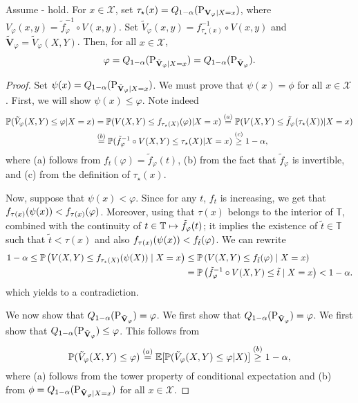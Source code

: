 
\begin{theorem}\label{thm:conditional:varphi}
  Assume - hold. For $x \in \mathcal{X}$, set $\tau_{\star}(x)= Q_{1-\alpha}(\textup{P}_{\mathbf{V}_\varphi|X=x})$, where $V_\varphi(x,y)= \tilde{f}^{-1}_\varphi \circ V(x,y)$. Set  $\tilde{V}_\varphi(x,y)= f_{\tau_\star(x)}^{-1} \circ V(x,y)$ and $\tilde{\mathbf{V}}_\varphi= \tilde{V}_\varphi(X,Y)$.
  Then,  for all $x \in \mathcal{X}$, 
  \[
    \varphi= Q_{1-\alpha}(\textup{P}_{\tilde{\mathbf{V}}_\varphi|X=x})= Q_{1-\alpha}(\textup{P}_{\tilde{\mathbf{V}}_\varphi}).
  \]
\end{theorem}

\begin{proof}
  Set $\psi(x)= Q_{1-\alpha}(\textup{P}_{\tilde{\mathbf{V}}_\varphi|X=x})$. We must prove that $\psi(x)= \phi$ for all $x \in \mathcal{X}$. First, we will show $\psi(x) \leq \varphi$. Note indeed
  \begin{align}
    \mathbb{P}( \tilde{V}_\varphi(X,Y) \leq \varphi | X=x) &= 
    \mathbb{P}( V(X,Y) \leq f_{\tau_\star(X)}(\varphi) | X=x) \stackrel{(a)}{=} \mathbb{P}(V(X,Y) \leq \tilde{f}_{\varphi}(\tau_\star(X))|X=x) \\ &\stackrel{(b)}{=} \mathbb{P}(\tilde{f}_\varphi^{-1} \circ V(X,Y) \leq \tau_\star(X) | X=x)  \stackrel{(c)}{\geq} 1-\alpha,
  \end{align}
  where (a) follows from $f_t(\varphi)= \tilde{f}_\varphi(t)$, (b) from the fact that $\tilde{f}_\varphi$ is invertible, and (c) from the definition of $\tau_\star(x)$.

  Now, suppose that  $\psi(x) <\varphi$. Since for any $t$, $f_t$ is increasing, we get that $f_{\tau(x)}(\psi(x))<f_{\tau(x)}(\varphi)$. Moreover, using that $\tau(x)$ belongs to the interior of $\mathbb{T}$, combined with the continuity of $t\in\mathbb{T}\mapsto\tilde{f}_{\varphi}(t)$; it implies the existence of $\tilde{t}\in\mathbb{T}$ such that $\tilde{t}<\tau(x)$ and also $f_{\tau(x)}(\psi(x)) < f_{\tilde{t}}(\varphi)$.
  We can rewrite
  \begin{align*}
    1-\alpha \leq \mathbb{P}\left({V(X,Y)\le f_{\tau_\star(X)}(\psi(X)) \mid X=x}\right)
    &\le \mathbb{P}\left({V(X,Y)\le f_{\tilde{t}}(\varphi) \mid X=x}\right)
    \\
    &= \mathbb{P}\left({\tilde{f}_{\varphi}^{-1} \circ V(X,Y)\le \tilde{t} \mid X=x}\right) < 1-\alpha.
  \end{align*}
  which yields to a contradiction.

  We now show that $Q_{1-\alpha}(\textup{P}_{\tilde{\mathbf{V}}_\varphi})= \varphi$. We first show that $Q_{1-\alpha}(\textup{P}_{\tilde{\mathbf{V}}_\varphi})= \varphi$. We first show that $Q_{1-\alpha}(\textup{P}_{\tilde{\mathbf{V}}_\varphi}) \leq \varphi$. This follows from 
  \[
    \mathbb{P}(\tilde{V}_\varphi(X,Y) \leq \varphi) \stackrel{(a)}{=}
    \mathbb{E}[ \mathbb{P}(\tilde{V}_\varphi(X,Y) \leq \varphi |X)] \stackrel{(b)}{\geq} 1 - \alpha,
  \]
  where (a) follows from the tower property of conditional expectation and (b) from $\phi= Q_{1-\alpha}(\textup{P}_{\tilde{\mathbf{V}}_\varphi|X=x})$ for all $x \in \mathcal{X}$. 


\end{proof}
